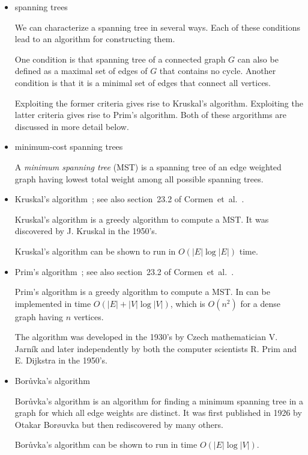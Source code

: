 \begin{itemize}
\item spanning trees

We can characterize a spanning tree in several ways. Each of these
conditions lead to an algorithm for constructing them.

One condition is that spanning tree of a connected graph $G$ can also
be defined as a maximal set of edges of $G$ that contains no cycle.
Another condition is that it is a minimal set of edges that connect
all vertices.

Exploiting the former criteria gives rise to Kruskal's algorithm.
Exploiting the latter criteria gives rise to Prim's algorithm.
Both of these argorithms are discussed in more detail below.

\item minimum-cost spanning trees

A {\it minimum spanning tree} (MST) is a spanning
tree of an edge weighted graph having lowest total weight
among all possible spanning trees.


\item Kruskal's algorithm~\cite{Kruskal1956}; see also section~23.2 of
  Cormen~et~al.~\cite{CormenEtAl2001}.

Kruskal's algorithm is a greedy algorithm to compute a MST.
It was discovered by J. Kruskal in the 1950's.

Kruskal's algorithm can be shown to run in $O(|E| \log |E|)$ time.


\item Prim's algorithm~\cite{Prim1957}; see also section~23.2 of
  Cormen~et~al.~\cite{CormenEtAl2001}.

Prim's algorithm is a greedy algorithm to compute a MST. In can be
implemented in time $O(|E| + |V| \log |V|)$, which is
$O(n^2)$ for a dense graph having $n$ vertices.

The algorithm was developed in the 1930's by Czech mathematician V.
Jarn\'ik and later independently by both the computer scientists R. Prim
and E. Dijkstra in the 1950's.

\item Bor\r{u}vka's algorithm~\cite{Boruvka1926a,Boruvka1926b}

Bor\r{u}vka's algorithm is an algorithm for finding a minimum spanning
tree in a graph
for which all edge weights are distinct.
It was first published in 1926 by Otakar Bor\o uvka but then
rediscovered by many others.

Bor\r{u}vka's algorithm can be shown to run in time
$O(|E|\log |V|)$.


\end{itemize}

